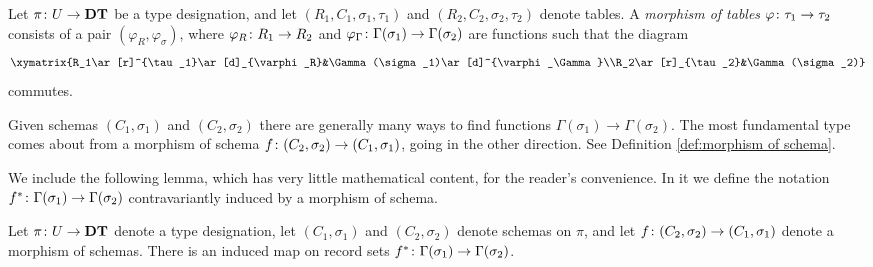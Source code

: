 \documentclass{amsart}
\def\DT{{\bf DT}}
\begin{document}
\begin{definition}\label{def:morphism of tables}

Let $\pi\taking U\to\DT$ be a type designation, and let $(R_1,C_1,\sigma_1,\tau_1)$ and $(R_2,C_2,\sigma_2,\tau_2)$ denote tables.  A {\em morphism of tables} $\varphi\colon\tau_1\rightarrow\tau_2$ consists of a pair $(\varphi_R,\varphi_\sigma)$, where $\varphi_R\colon R_1\rightarrow R_2$ and $\varphi_\Gamma\colon\Gamma(\sigma_1)\rightarrow\Gamma(\sigma_2)$ are functions such that the diagram \begin{align}\label{dia:morphism of tables}\xymatrix{R_1\ar[r]^{\tau_1}\ar[d]_{\varphi_R}&\Gamma(\sigma_1)\ar[d]^{\varphi_\Gamma}\\R_2\ar[r]_{\tau_2}&\Gamma(\sigma_2)}\end{align} commutes.

\end{definition}

Given schemas $(C_1,\sigma_1)$ and $(C_2,\sigma_2)$ there are generally many ways to find functions $\Gamma(\sigma_1)\to\Gamma(\sigma_2)$.  The most fundamental type comes about from a morphism of schema $f\colon (C_2,\sigma_2)\rightarrow (C_1,\sigma_1)$, going in the other direction.  See Definition \ref{def:morphism of schema}.

We include the following lemma, which has very little mathematical content, for the reader's convenience.  In it we define the notation $f^*\colon\Gamma(\sigma_1)\rightarrow\Gamma(\sigma_2)$ contravariantly induced by a morphism of schema.

\begin{lemma}\label{induced morphisms}

Let $\pi\taking U\to\DT$ denote a type designation, let $(C_1,\sigma_1)$ and $(C_2,\sigma_2)$ denote schemas on $\pi$, and let $f\colon (C_2,\sigma_2)\rightarrow (C_1,\sigma_1)$ denote a morphism of schemas.  There is an induced map on record sets $f^*\colon \Gamma(\sigma_1)\rightarrow\Gamma(\sigma_2)$.

\end{lemma}
\end{document}
